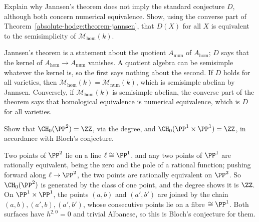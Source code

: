 \begin{exercise}\label{absolute-hodge:exercise-jannsen-not-d}
Explain why Jannsen's theorem does not imply the standard conjecture $D$, although both concern numerical equivalence. Show, using the converse part of Theorem~\ref{absolute-hodge:theorem-jannsen},
that $D(X)$ for all $X$ is equivalent to the semisimplicity of $\mathcal{M}_{\mathrm{hom}}(k)$.
\end{exercise}

\begin{solution}
Jannsen's theorem is a statement about the quotient $A_{\mathrm{num}}$ of $A_{\mathrm{hom}}$; $D$ says that the kernel of $A_{\mathrm{hom}} \to A_{\mathrm{num}}$ vanishes. A quotient algebra can be semisimple whatever the kernel is, so
the first says nothing about the second. If $D$ holds for all varieties, then $\mathcal{M}_{\mathrm{hom}}(k) = \mathcal{M}_{\mathrm{num}}(k)$, which is semisimple abelian by Jannsen. Conversely, if
$\mathcal{M}_{\mathrm{hom}}(k)$ is semisimple abelian, the converse part of the theorem says that homological equivalence is numerical equivalence, which is $D$ for all varieties.
\end{solution}

\begin{exercise}\label{absolute-hodge:exercise-chow-plane}
Show that $\CH_0(\PP^2) = \ZZ$, via the degree, and $\CH_0(\PP^1 \times \PP^1) = \ZZ$, in accordance with Bloch's conjecture.
\end{exercise}

\begin{solution}
Two points of $\PP^2$ lie on a line $\ell \cong \PP^1$, and any two points of $\PP^1$ are rationally equivalent, being the zero and the pole of a rational function; pushing forward along $\ell \to \PP^2$, the two points are
rationally equivalent on $\PP^2$. So $\CH_0(\PP^2)$ is generated by the class of one point, and the degree shows it is $\ZZ$. On $\PP^1 \times \PP^1$, the points $(a, b)$ and $(a', b')$ are joined by the chain
$(a, b), (a', b), (a', b')$, whose consecutive points lie on a fibre $\cong \PP^1$. Both surfaces have $h^{2,0} = 0$ and trivial Albanese, so this is Bloch's conjecture for them.
\end{solution}
